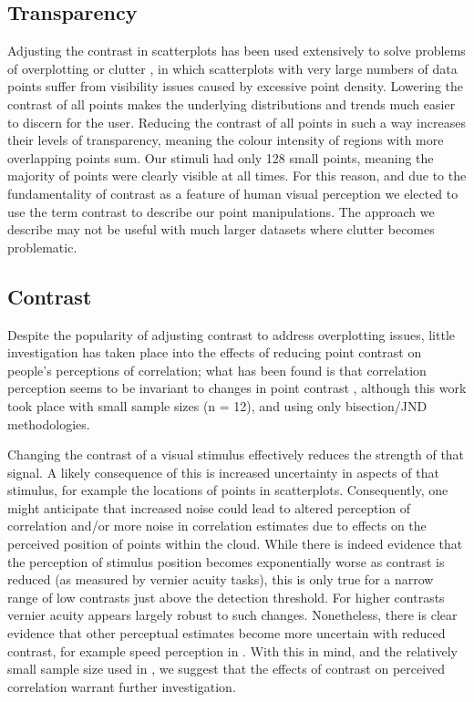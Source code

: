 \documentclass[preprint, 3p,
authoryear]{elsarticle} %
\begin{document}
\hypertarget{transparency}{%
\subsection{Transparency}\label{transparency}}

Adjusting the contrast in scatterplots has been used extensively to
solve problems of overplotting or clutter
\citep{matejka_2015, bertini_2004}, in which scatterplots with very
large numbers of data points suffer from visibility issues caused by
excessive point density. Lowering the contrast of all points makes the
underlying distributions and trends much easier to discern for the user.
Reducing the contrast of all points in such a way increases their levels
of transparency, meaning the colour intensity of regions with more
overlapping points sum. Our stimuli had only 128 small points, meaning
the majority of points were clearly visible at all times. For this
reason, and due to the fundamentality of contrast as a feature of human
visual perception \citep{ginsburg_2003} we elected to use the term
contrast to describe our point manipulations. The approach we describe
may not be useful with much larger datasets where clutter becomes
problematic.

\hypertarget{contrast}{%
\subsection{Contrast}\label{contrast}}

Despite the popularity of adjusting contrast to address overplotting
issues, little investigation has taken place into the effects of
reducing point contrast on people's perceptions of correlation; what has
been found is that correlation perception seems to be invariant to
changes in point contrast \citep{rensink_2012}, although this work took
place with small sample sizes (n = 12), and using only bisection/JND
methodologies.

Changing the contrast of a visual stimulus effectively reduces the
strength of that signal. A likely consequence of this is increased
uncertainty in aspects of that stimulus, for example the locations of
points in scatterplots. Consequently, one might anticipate that
increased noise could lead to altered perception of correlation and/or
more noise in correlation estimates due to effects on the perceived
position of points within the cloud. While there is indeed evidence
\citep{wehrhahn_1990} that the perception of stimulus position becomes
exponentially worse as contrast is reduced (as measured by vernier
acuity tasks), this is only true for a narrow range of low contrasts
just above the detection threshold. For higher contrasts vernier acuity
appears largely robust to such changes. Nonetheless, there is clear
evidence that other perceptual estimates become more uncertain with
reduced contrast, for example speed perception in \citet{champion_2017}.
With this in mind, and the relatively small sample size used in
\citet{rensink_2012}, we suggest that the effects of contrast on
perceived correlation warrant further investigation.
\end{document}
